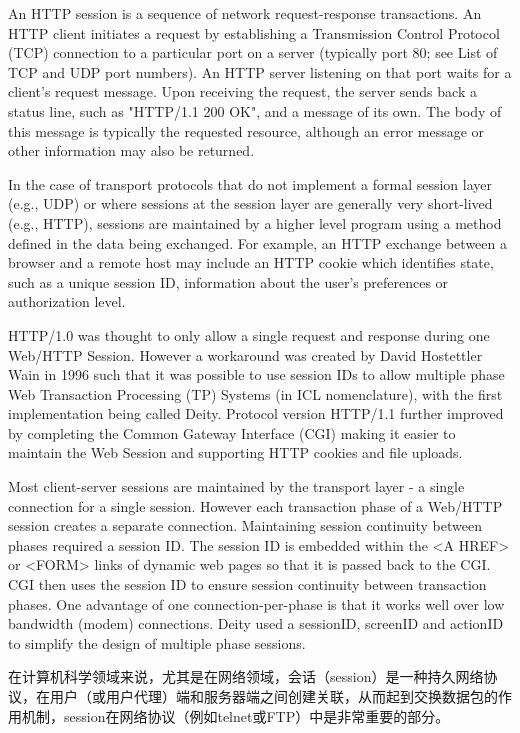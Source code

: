 An HTTP session is a sequence of network request-response transactions. An HTTP client initiates a request by establishing a Transmission Control Protocol (TCP) connection to a particular port on a server (typically port 80; see List of TCP and UDP port numbers). An HTTP server listening on that port waits for a client's request message. Upon receiving the request, the server sends back a status line, such as "HTTP/1.1 200 OK", and a message of its own. The body of this message is typically the requested resource, although an error message or other information may also be returned.


In the case of transport protocols that do not implement a formal session layer (e.g., UDP) or where sessions at the session layer are generally very short-lived (e.g., HTTP), sessions are maintained by a higher level program using a method defined in the data being exchanged. For example, an HTTP exchange between a browser and a remote host may include an HTTP cookie which identifies state, such as a unique session ID, information about the user's preferences or authorization level.

HTTP/1.0 was thought to only allow a single request and response during one Web/HTTP Session. However a workaround was created by David Hostettler Wain in 1996 such that it was possible to use session IDs to allow multiple phase Web Transaction Processing (TP) Systems (in ICL nomenclature), with the first implementation being called Deity. Protocol version HTTP/1.1 further improved by completing the Common Gateway Interface (CGI) making it easier to maintain the Web Session and supporting HTTP cookies and file uploads.

Most client-server sessions are maintained by the transport layer - a single connection for a single session. However each transaction phase of a Web/HTTP session creates a separate connection. Maintaining session continuity between phases required a session ID. The session ID is embedded within the <A HREF> or <FORM> links of dynamic web pages so that it is passed back to the CGI. CGI then uses the session ID to ensure session continuity between transaction phases. One advantage of one connection-per-phase is that it works well over low bandwidth (modem) connections. Deity used a sessionID, screenID and actionID to simplify the design of multiple phase sessions.

在计算机科学领域来说，尤其是在网络领域，会话（session）是一种持久网络协议，在用户（或用户代理）端和服务器端之间创建关联，从而起到交换数据包的作用机制，session在网络协议（例如telnet或FTP）中是非常重要的部分。


